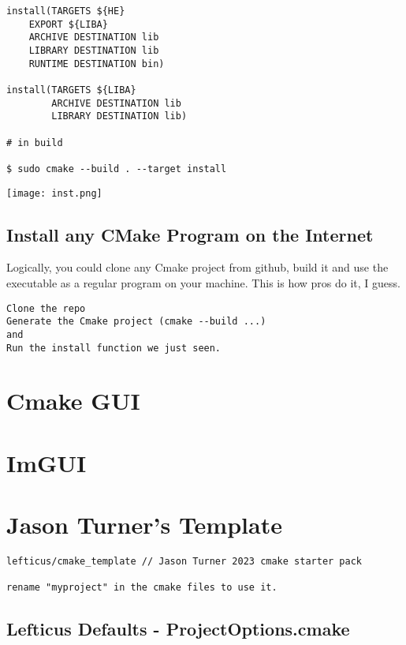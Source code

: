 \documentclass[openany]{report}
\begin{document}
\begin{verbatim}
install(TARGETS ${HE}
    EXPORT ${LIBA}
    ARCHIVE DESTINATION lib
    LIBRARY DESTINATION lib
    RUNTIME DESTINATION bin) 

install(TARGETS ${LIBA}
        ARCHIVE DESTINATION lib
        LIBRARY DESTINATION lib)

# in build

$ sudo cmake --build . --target install
\end{verbatim}


\begin{center}
    \texttt{[image: inst.png]}
\end{center}

\subsection{Install any CMake Program on the Internet}

Logically, you could clone any Cmake project from github, build it and use the executable as a regular
program on your machine. This is how pros do it, I guess.


\begin{verbatim}
Clone the repo
Generate the Cmake project (cmake --build ...)
and
Run the install function we just seen.
\end{verbatim}


\section{Cmake GUI}

\section{ImGUI}



\section{Jason Turner's Template}

\begin{verbatim}
lefticus/cmake_template // Jason Turner 2023 cmake starter pack

rename "myproject" in the cmake files to use it.

\end{verbatim}

\subsection{Lefticus Defaults - ProjectOptions.cmake}
\end{document}
